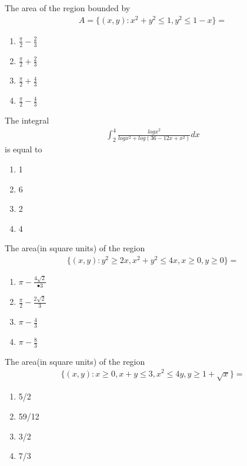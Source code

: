 \item The area of the region bounded by 
\begin{align*}
A = \{(x, y): x^2 + y^2 \leq 1, y^2 \leq 1 - x\} = 
\end{align*} 
\begin{enumerate}
\item $\frac{\pi}{2} - \frac{2}{3}$
\item $\frac{\pi}{2} + \frac{2}{3}$
\item $\frac{\pi}{2} + \frac{4}{3}$
\item $\frac{\pi}{2} - \frac{4}{3}$
\end{enumerate}

\item The integral
\begin{align*}
\int_{2}^{4}\frac{log x^2}{log x^2 + log(36 - 12x + x^2)}dx
\end{align*}
is equal to
\begin{enumerate}
\item 1
\item 6
\item 2
\item 4
\end{enumerate}

\item The area(in square units) of the region
\begin{align*}
\{(x, y): y^2 \geq 2x, x^2 + y^2 \leq 4x, x \geq 0, y \geq 0\} = 
\end{align*}
\begin{enumerate}
\item $\pi - \frac{4\sqrt{2}}{•3}$
\item $\frac{\pi}{2} - \frac{2\sqrt{2}}{3}$
\item $\pi - \frac{4}{3}$
\item $\pi - \frac{8}{3}$
\end{enumerate}

\item The area(in square units) of the region
\begin{align*}
\{(x, y): x \geq 0, x + y \leq 3, x^2 \leq 4y, y \geq 1 + \sqrt{x}\} = 
\end{align*}
\begin{enumerate}
\item 5/2
\item 59/12
\item 3/2
\item 7/3
\end{enumerate}


